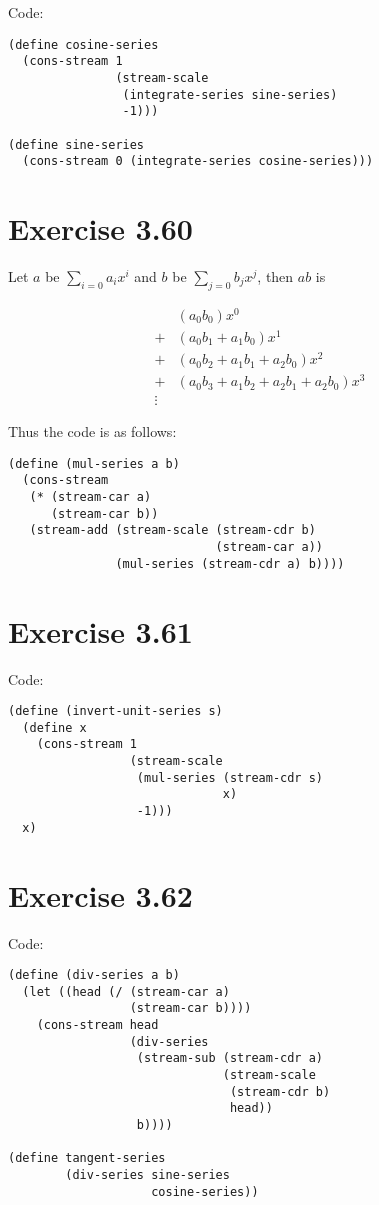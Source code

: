 \documentclass[../main.tex]{subfiles}
\begin{document}
Code:

\begin{lstlisting}
(define cosine-series
  (cons-stream 1
               (stream-scale
                (integrate-series sine-series)
                -1)))

(define sine-series
  (cons-stream 0 (integrate-series cosine-series)))
\end{lstlisting}

\section{Exercise 3.60}

Let $a$ be $\sum_{i=0}a_ix^i$ and $b$ be $\sum_{j=0}b_jx^j$, then $ab$ is

\begin{align*}
& (a_0b_0)x^0\\
+& (a_0b_1 + a_1b_0)x^1\\
+& (a_0b_2 + a_1b_1 + a_2b_0)x^2\\
+& (a_0b_3 + a_1b_2 + a_2b_1 + a_2b_0)x^3\\
\vdots
\end{align*}

Thus the code is as follows:

\begin{lstlisting}
(define (mul-series a b)
  (cons-stream
   (* (stream-car a)
      (stream-car b))
   (stream-add (stream-scale (stream-cdr b)
                             (stream-car a))
               (mul-series (stream-cdr a) b))))
\end{lstlisting}

\section{Exercise 3.61}

Code:

\begin{lstlisting}
(define (invert-unit-series s)
  (define x
    (cons-stream 1
                 (stream-scale
                  (mul-series (stream-cdr s)
                              x)
                  -1)))
  x)
\end{lstlisting}

\section{Exercise 3.62}

Code:

\begin{lstlisting}
(define (div-series a b)
  (let ((head (/ (stream-car a)
                 (stream-car b))))
    (cons-stream head
                 (div-series
                  (stream-sub (stream-cdr a)
                              (stream-scale
                               (stream-cdr b)
                               head))
                  b))))

(define tangent-series
        (div-series sine-series
                    cosine-series))
\end{lstlisting}
\end{document}
